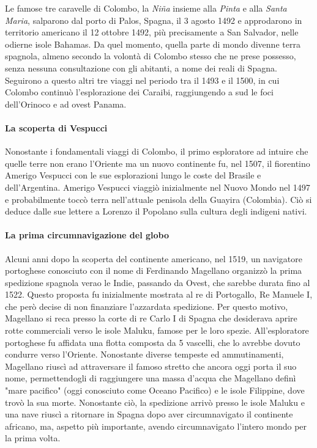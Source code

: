 \documentclass[11pt]{report}
\begin{document}
	Le famose tre caravelle di Colombo, la \textit{Niña} insieme alla \textit{Pinta} e alla \textit{Santa Maria}, salparono dal porto di Palos, Spagna, il 3 agosto 1492 e approdarono in territorio americano il 12 ottobre 1492, più precisamente a San Salvador, nelle odierne isole Bahamas. Da quel momento, quella parte di mondo divenne terra spagnola, almeno secondo la volontà di Colombo stesso che ne prese possesso, senza nessuna consultazione con gli abitanti, a nome dei reali di Spagna. Seguirono a questo altri tre viaggi nel periodo tra il 1493 e il 1500, in cui Colombo continuò l'esplorazione dei Caraibi, raggiungendo a sud le foci dell'Orinoco e ad ovest Panama.
	
	\paragraph{La scoperta di Vespucci}
	
	Nonostante i fondamentali viaggi di Colombo, il primo esploratore ad intuire che quelle terre non erano l'Oriente ma un nuovo continente fu, nel 1507, il fiorentino Amerigo Vespucci con le sue esplorazioni lungo le coste del Brasile e dell'Argentina. Amerigo Vespucci viaggiò inizialmente nel Nuovo Mondo nel 1497 e probabilmente toccò terra nell'attuale penisola della Guayira (Colombia). Ciò si deduce dalle sue lettere a Lorenzo il Popolano sulla cultura degli indigeni nativi.\cite{robertson1917vespucci}
	
	\paragraph*{La prima circumnavigazione del globo}
	
	Alcuni anni dopo la scoperta del continente americano, nel 1519, un navigatore portoghese conosciuto con il nome di Ferdinando Magellano organizzò la prima spedizione spagnola verao le Indie, passando da Ovest, che sarebbe durata fino al 1522. Questo proposta fu inizialmente mostrata al re di Portogallo, Re Manuele I, che però decise di non finanziare l'azzardata spedizione. Per questo motivo, Magellano si reca presso la corte di re Carlo I di Spagna che desiderava aprire rotte commerciali verso le isole Maluku, famose per le loro spezie. All'esploratore portoghese fu affidata una flotta composta da 5 vascelli, che lo avrebbe dovuto condurre verso l'Oriente. Nonostante diverse tempeste ed ammutinamenti, Magellano riuscì ad attraversare il famoso stretto che ancora oggi porta il suo nome, permettendogli di raggiungere una massa d'acqua che Magellano definì "mare pacifico" (oggi conosciuto come Oceano Pacifico) e le isole Filippine, dove trovò la sua morte.\cite{hartig1910magellan} Nonostante ciò, la spedizione arrivò presso le isole Maluku e una nave riuscì a ritornare in Spagna dopo aver circumnavigato il continente africano, ma, aspetto più importante, avendo circumnavigato l'intero mondo per la prima volta.
	
\end{document}

